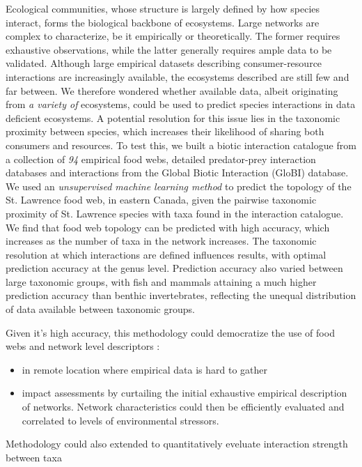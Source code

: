 \documentclass[letterpaper]{article}
\begin{document}
Ecological communities, whose structure is largely defined by how species interact, forms the biological backbone of ecosystems. Large networks are complex to characterize, be it empirically or theoretically. The former requires exhaustive observations, while the latter generally requires ample data to be validated. Although large empirical datasets describing consumer-resource interactions are increasingly available, the ecosystems described are still few and far between. We therefore wondered whether available data, albeit originating from \textit{a variety of} ecosystems, could be used to predict species interactions in data deficient ecosystems. A potential resolution for this issue lies in the taxonomic proximity between species, which increases their likelihood of sharing both consumers and resources. To test this, we built a biotic interaction catalogue from a collection of \textit{94} empirical food webs, detailed predator-prey interaction databases and interactions from the Global Biotic Interaction (GloBI) database. We used an \textit{unsupervised machine learning method} to predict the topology of the St. Lawrence food web, in eastern Canada, given the pairwise taxonomic proximity of St. Lawrence species with taxa found in the interaction catalogue. We find that food web topology can be predicted with high accuracy, which increases as the number of taxa in the network increases. The taxonomic resolution at which interactions are defined influences results, with optimal prediction accuracy at the genus level. Prediction accuracy also varied between large taxonomic groups, with fish and mammals attaining a much higher prediction accuracy than benthic invertebrates, reflecting the unequal distribution of data available between taxonomic groups.



Given it's high accuracy, this methodology could democratize the use of food webs and network level descriptors :
\begin{itemize}
\item in remote location where empirical data is hard to gather
\item impact assessments by curtailing the initial exhaustive empirical description of networks. Network characteristics could then be efficiently evaluated and correlated to levels of environmental stressors.
\end{itemize}

Methodology could also extended to quantitatively eveluate interaction strength between taxa %
\end{document}
